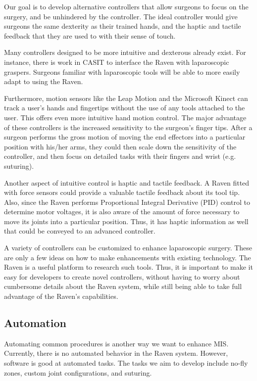 \documentclass[letterpaper,twocolumn,10pt]{article}
\begin{document}
Our goal is to develop alternative controllers that allow surgeons to
focus on the surgery, and be unhindered by the controller. The ideal
controller would give surgeons the same dexterity as their trained
hands, and the haptic and tactile feedback that they are used to with
their sense of touch.

Many controllers designed to be more intuitive and dexterous already
exist. For instance, there is work in CASIT to interface the Raven
with laparoscopic graspers. Surgeons familiar with laparoscopic tools
will be able to more easily adapt to using the Raven.

Furthermore, motion sensors like the Leap Motion and the Microsoft
Kinect can track a user's hands and fingertips without the use of any
tools attached to the user. This offers even more intuitive hand
motion control. The major advantage of these controllers is the
increased sensitivity to the surgeon's finger tips. After a surgeon
performs the gross motion of moving the end effectors into a
particular position with his/her arms, they could then scale down the
sensitivity of the controller, and then focus on detailed tasks with
their fingers and wrist (e.g. suturing).

Another aspect of intuitive control is haptic and tactile feedback. A
Raven fitted with force sensors could provide a valuable tactile
feedback about its tool tip. Also, since the Raven performs
Proportional Integral Derivative (PID) control to determine motor
voltages, it is also aware of the amount of force necessary to move
its joints into a particular position. Thus, it has haptic information
as well that could be conveyed to an advanced controller.

A variety of controllers can be customized to enhance laparoscopic
surgery. These are only a few ideas on how to make enhancements with
existing technology. The Raven is a useful platform to research such
tools. Thus, it is important to make it easy for developers to create
novel controllers, without having to worry about cumbersome details
about the Raven system, while still being able to take full advantage
of the Raven's capabilities.

\subsection{Automation}
Automating common procedures is another way we want to enhance MIS.
Currently, there is no automated behavior in the Raven system. However, 
software is good at automated tasks. The tasks we aim to  
develop include no-fly zones, custom joint configurations, and 
suturing.
\end{document}
